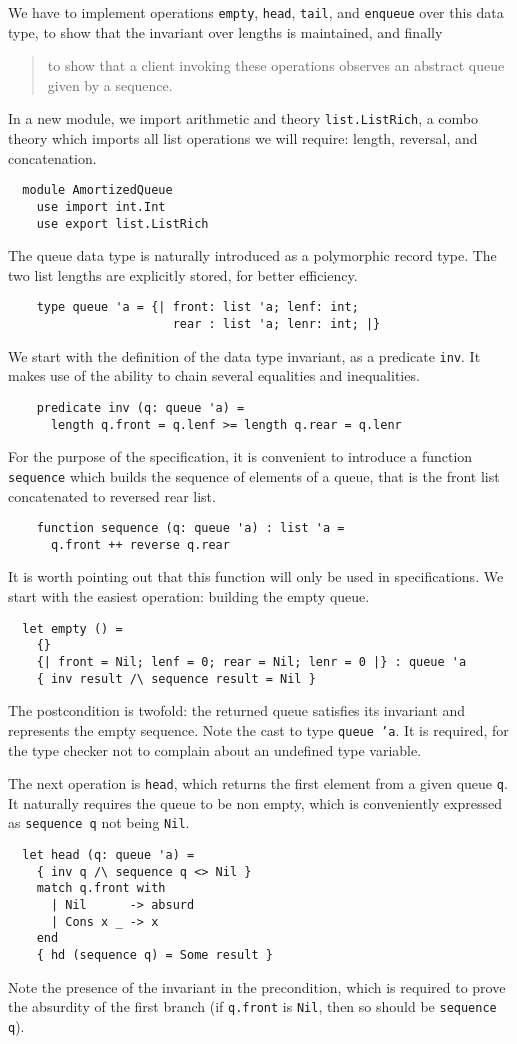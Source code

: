 We have to implement operations \texttt{empty}, \texttt{head},
\texttt{tail}, and \texttt{enqueue} over this data type,
to show that the invariant over lengths is maintained, and finally
\begin{quote}
  to show that a client invoking these operations
  observes an abstract queue given by a sequence.
\end{quote}
In a new module, we import arithmetic and theory
\texttt{list.ListRich}, a combo theory which imports all list
operations we will require: length, reversal, and concatenation.
\begin{verbatim}
  module AmortizedQueue
    use import int.Int
    use export list.ListRich
\end{verbatim}
The queue data type is naturally introduced as a polymorphic record type.
The two list lengths are explicitly stored, for better efficiency.
\begin{verbatim}
    type queue 'a = {| front: list 'a; lenf: int;
                       rear : list 'a; lenr: int; |}
\end{verbatim}
We start with the definition of the data type invariant, as a
predicate \texttt{inv}. It makes use of the ability to chain
several equalities and inequalities.
\begin{verbatim}
    predicate inv (q: queue 'a) =
      length q.front = q.lenf >= length q.rear = q.lenr
\end{verbatim}
For the purpose of the specification, it is convenient to introduce a function
\texttt{sequence} which builds the sequence of elements of a queue, that
is the front list concatenated to reversed rear list.
\begin{verbatim}
    function sequence (q: queue 'a) : list 'a =
      q.front ++ reverse q.rear
\end{verbatim}
It is worth pointing out that this function will only be used in
specifications.
We start with the easiest operation: building the empty queue.
\begin{verbatim}
  let empty () =
    {}
    {| front = Nil; lenf = 0; rear = Nil; lenr = 0 |} : queue 'a
    { inv result /\ sequence result = Nil }
\end{verbatim}
The postcondition is twofold: the returned queue satisfies its
invariant and represents the empty sequence.
Note the cast to type \texttt{queue 'a}. It is required, for the
type checker not to complain about an undefined type variable.

The next operation is \texttt{head}, which returns the first element from
a given queue \texttt{q}. It naturally requires the queue to be non
empty, which is conveniently expressed as \texttt{sequence q} not
being \texttt{Nil}.
\begin{verbatim}
  let head (q: queue 'a) =
    { inv q /\ sequence q <> Nil }
    match q.front with
      | Nil      -> absurd
      | Cons x _ -> x
    end
    { hd (sequence q) = Some result }
\end{verbatim}
Note the presence of the invariant in the precondition, which is
required to prove the absurdity of the first branch (if
\texttt{q.front} is \texttt{Nil}, then so should be \texttt{sequence q}).

